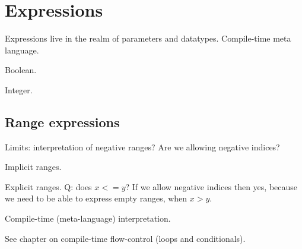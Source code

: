 

\chapter{Expressions}
\label{sec:expressions}

Expressions live in the realm of parameters and datatypes.  
Compile-time meta language.  

Boolean.

Integer.

\section{Range expressions}
\label{sec:expression:range}

Limits: interpretation of negative ranges?
Are we allowing negative indices?

Implicit ranges.

Explicit ranges.
Q: does $x<=y$?
If we allow negative indices then yes, because we need to be able 
to express empty ranges, when $x>y$.

Compile-time (meta-language) interpretation.  

See chapter on compile-time flow-control (loops and conditionals).  



